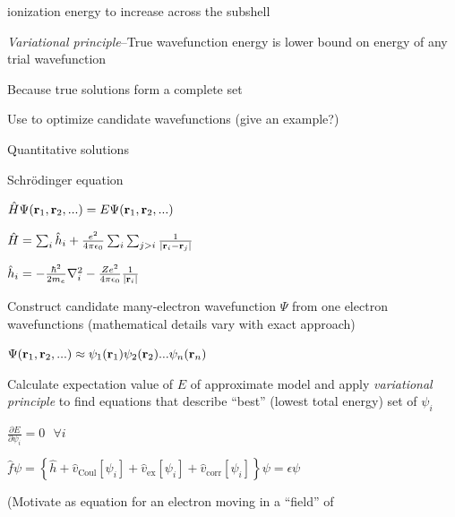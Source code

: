 \message{ !name(Outline.tex)}\documentclass[11pt]{article}
\begin{document}
\begin{outline}
\begin{outline}
\begin{outline}
\begin{outline}
        ionization energy to increase across the subshell
      \end{outline}
    \end{outline}
  \item {\em Variational principle}--True wavefunction energy is lower bound on
    energy of any trial wavefunction
    \begin{outline}
      \item Because true solutions form a complete set
      \item Use to optimize candidate wavefunctions (give an example?)
    \end{outline}
  \item Quantitative solutions
    \begin{outline}
    \item Schr\"odinger equation
     \begin{outline}
     \item $\hat H \Psi({\bf r}_1, {\bf r}_2,...)=E \Psi({\bf r}_1, {\bf r}_2,...)$
     \item $\hat H = \sum_i \hat h_i + \frac{e^2}{4 \pi
         \epsilon_0}\sum_i\sum_{j>i}\frac{1}{|{\bf r}_i-{\bf r}_j|}$
     \item $\hat h_i = -\frac{\hbar^2}{2m_e}\nabla^2_i-\frac{Z
         e^2}{4\pi\epsilon_0}\frac{1}{|{\bf r}_i|}$
     \end{outline}
   \item Construct candidate many-electron wavefunction $\Psi$ from one
     electron wavefunctions (mathematical details vary with exact approach)
       \begin{outline}
       \item $\Psi({\bf r}_1, {\bf r}_2,...)\approx \psi_1({\bf
           r}_1)\psi_2({\bf r}_2)...\psi_n({\bf r}_n)$
       \end{outline}
     \item Calculate expectation value of $E$ of approximate model and apply
      {\em  variational principle} to find equations that describe ``best'' (lowest
       total energy) set of $\psi_i$
       \begin{outline}
       \item $\frac{\partial E}{\partial \psi_i}=0 \ \ \ \forall i$
       \item $\hat f\psi=\left\{\hat h + \hat v_\mathrm{Coul}[\psi_i] + \hat
           v_\mathrm{ex}[\psi_i]+\hat v_\mathrm{corr}[\psi_i] \right\}\psi=\epsilon\psi$
       \item (Motivate as equation for an electron moving in a ``field'' of

\end{outline}
\end{outline}
\end{outline}
\end{outline}
\end{document}
